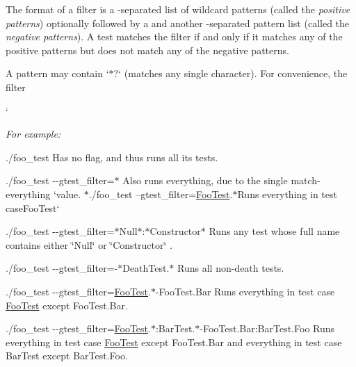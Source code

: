 The format of a filter is a \textquotesingle{}{\ttfamily \+:}\textquotesingle{}-\/separated list of wildcard patterns (called the {\itshape positive patterns}) optionally followed by a \textquotesingle{}{\ttfamily -\/}\textquotesingle{} and another \textquotesingle{}{\ttfamily \+:}\textquotesingle{}-\/separated pattern list (called the {\itshape negative patterns}). A test matches the filter if and only if it matches any of the positive patterns but does not match any of the negative patterns.

A pattern may contain `\textquotesingle{}$\ast$\textquotesingle{}?\textquotesingle{}` (matches any single character). For convenience, the filter

`

{\itshape For example\+:}

{\itshape 
\begin{DoxyItemize}
\item {\ttfamily ./foo\+\_\+test} Has no flag, and thus runs all its tests.
\item {\ttfamily ./foo\+\_\+test -\/-\/gtest\+\_\+filter=$\ast$} Also runs everything, due to the single match-\/everything `{\ttfamily value. $\ast$}./foo\+\_\+test --gtest\+\_\+filter=\hyperlink{classFooTest}{Foo\+Test}.$\ast${\ttfamily Runs everything in test case}Foo\+Test`
\item {\ttfamily ./foo\+\_\+test -\/-\/gtest\+\_\+filter=$\ast$\+Null$\ast$\+:$\ast$\+Constructor$\ast$} Runs any test whose full name contains either {\ttfamily \char`\"{}\+Null\char`\"{}} or {\ttfamily \char`\"{}\+Constructor\char`\"{}} .
\item {\ttfamily ./foo\+\_\+test -\/-\/gtest\+\_\+filter=-\/$\ast$\+Death\+Test.$\ast$} Runs all non-\/death tests.
\item {\ttfamily ./foo\+\_\+test -\/-\/gtest\+\_\+filter=\hyperlink{classFooTest}{Foo\+Test}.$\ast$-\/\+Foo\+Test.Bar} Runs everything in test case {\ttfamily \hyperlink{classFooTest}{Foo\+Test}} except {\ttfamily Foo\+Test.\+Bar}.
\item {\ttfamily ./foo\+\_\+test -\/-\/gtest\+\_\+filter=\hyperlink{classFooTest}{Foo\+Test}.$\ast$\+:Bar\+Test.$\ast$-\/\+Foo\+Test.Bar\+:Bar\+Test.\+Foo} Runs everything in test case {\ttfamily \hyperlink{classFooTest}{Foo\+Test}} except {\ttfamily Foo\+Test.\+Bar} and everything in test case {\ttfamily Bar\+Test} except {\ttfamily Bar\+Test.\+Foo}.
\end{DoxyItemize}}

